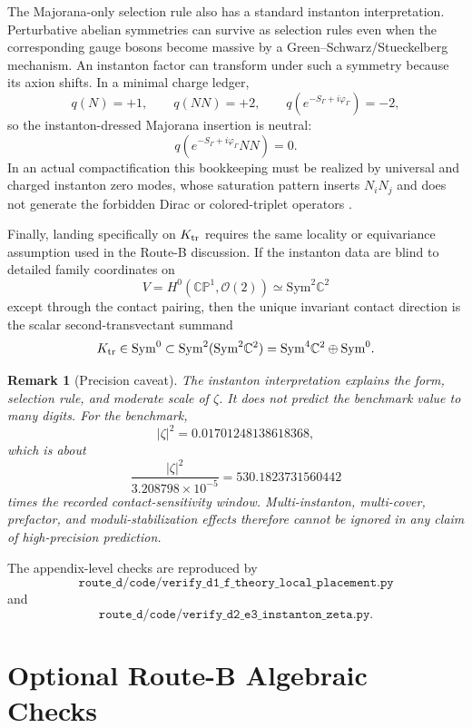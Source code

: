 \documentclass[
  aps,
  prd,
  preprint,
  nofootinbib,
  superscriptaddress,
  longbibliography
]{revtex4-2}
\newcommand{\CP}{\mathbb{CP}}
\newcommand{\cO}{\mathcal{O}}
\newtheorem{remark}[theorem]{Remark}
\begin{document}
The Majorana-only selection rule also has a standard instanton interpretation.
Perturbative abelian symmetries can survive as selection rules even when the
corresponding gauge bosons become massive by a Green--Schwarz/Stueckelberg
mechanism.  An instanton factor can transform under such a symmetry because
its axion shifts.  In a minimal charge ledger,
\[
  q(N)=+1,\qquad q(NN)=+2,\qquad q(e^{-S_\Gamma+i\varphi_\Gamma})=-2,
\]
so the instanton-dressed Majorana insertion is neutral:
\[
  q\!\left(e^{-S_\Gamma+i\varphi_\Gamma}NN\right)=0.
\]
In an actual compactification this bookkeeping must be realized by universal
and charged instanton zero modes, whose saturation pattern inserts \(N_iN_j\)
and does not generate the forbidden Dirac or colored-triplet operators
\cite{BianchiCollinucciMartucci2011,CveticDonagiHalversonMarsano2012}.

Finally, landing specifically on \(K_{\rm tr}\) requires the same locality or
equivariance assumption used in the Route-B discussion.  If the instanton data
are blind to detailed family coordinates on
\[
  V=H^0(\CP^1,\cO(2))\simeq \mathrm{Sym}^2\mathbb C^2
\]
except through the contact pairing, then the unique invariant contact
direction is the scalar second-transvectant summand
\[
  K_{\rm tr}\in\mathrm{Sym}^0
  \subset
  \mathrm{Sym}^2(\mathrm{Sym}^2\mathbb C^2)
  =
  \mathrm{Sym}^4\mathbb C^2\oplus\mathrm{Sym}^0.
\]

\begin{remark}[Precision caveat]
The instanton interpretation explains the form, selection rule, and moderate
scale of \(\zeta\).  It does not predict the benchmark value to many digits.
For the benchmark,
\[
  |\zeta|^2=0.01701248138618368,
\]
which is about
\[
  \frac{|\zeta|^2}{3.208798\times10^{-5}}
  =
  530.1823731560442
\]
times the recorded contact-sensitivity window.  Multi-instanton, multi-cover,
prefactor, and moduli-stabilization effects therefore cannot be ignored in any
claim of high-precision prediction.
\end{remark}

The appendix-level checks are reproduced by
\[
  \texttt{route\_d/code/verify\_d1\_f\_theory\_local\_placement.py}
\]
and
\[
  \texttt{route\_d/code/verify\_d2\_e3\_instanton\_zeta.py}.
\]

\section{\texorpdfstring{Optional Route-B Algebraic Checks}{Optional Route-B Algebraic Checks}}
\label{app:routeb-checks}
\end{document}

